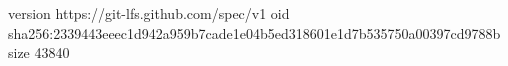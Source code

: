 version https://git-lfs.github.com/spec/v1
oid sha256:2339443eeec1d942a959b7cade1e04b5ed318601e1d7b535750a00397cd9788b
size 43840
